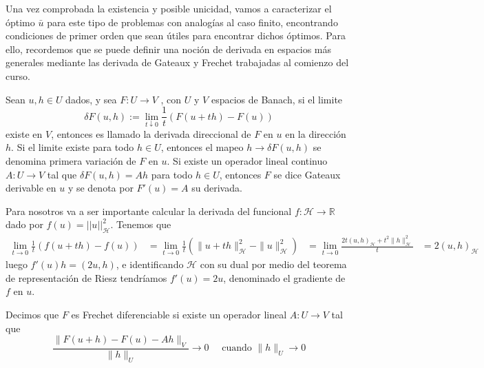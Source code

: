 \documentclass{article}
\begin{document}
\noindent
Una vez comprobada la existencia y posible unicidad, vamos a caracterizar el óptimo $\bar{u}$ para este tipo de problemas con analogías al caso finito, encontrando condiciones de primer orden que sean útiles para encontrar dichos óptimos. Para ello, recordemos que se puede definir una noción de derivada en espacios más generales mediante las derivada de Gateaux y Frechet trabajadas al comienzo del curso.\\

\begin{definition}
Sean $u,h\in U$ dados, y sea $F:U\to V$ , con $U$ y $V$ espacios de Banach, si el limite
\begin{equation}\delta F(u, h):=\lim _{t \downarrow 0} \frac{1}{t}(F(u+t h)-F(u))\end{equation}
existe en $V$, entonces es llamado la derivada direccional de $F$ en $u$ en la dirección $h$. Si el limite existe para todo $h\in U$, entonces el mapeo $h\to \delta F(u,h)$ se denomina primera variación de $F$ en $u$. Si existe un operador lineal continuo $A:U\to V$ tal que $\delta F(u,h)=Ah$ para todo $h\in U$, entonces $F$ se dice Gateaux derivable en $u$ y se denota por $F'(u)=A$ su derivada.
\end{definition}

\noindent
Para nosotros va a ser importante calcular la derivada del funcional $f:\mathcal{H}\to \mathbb{R}$ dado por $f(u)=||u||_{\mathcal{H}}^2$. Tenemos que \begin{equation*}\begin{aligned}
\lim _{t \rightarrow 0} \frac{1}{t}(f(u+t h)-f(u)) &=\lim _{t \rightarrow 0} \frac{1}{t}\left(\|u+t h\|_{\mathcal{H}}^{2}-\|u\|_{\mathcal{H}}^{2}\right) 
&=\lim _{t \rightarrow 0} \frac{2 t(u, h)_{\mathcal{H}}+t^{2}\|h\|_{\mathcal{H}}^{2}}{t} 
&=2(u, h)_{\mathcal{H}}
\end{aligned}\end{equation*}
luego $f'(u)h=(2u,h)$, e identificando $\mathcal{H}$ con su dual por medio del teorema de representación de Riesz tendríamos $f'(u)=2u$, denominado el gradiente de $f$ en $u$.

\begin{definition}
Decimos que $F$ es Frechet diferenciable si existe un operador lineal $A:U\to V$ tal que
\begin{equation}\frac{\|F(u+h)-F(u)-A h\|_{V}}{\|h\|_{U}} \rightarrow 0 \quad \text { cuando }\|h\|_{U} \rightarrow 0\end{equation}
\end{definition}
\end{document}
